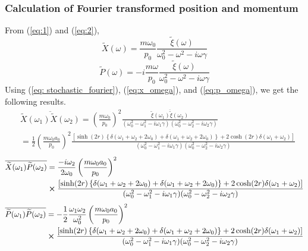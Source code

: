 \documentclass[12pt, twoside]{article}
\begin{document}
\subsubsection{Calculation of Fourier transformed position and momentum}
From (\ref{eq:1}) and (\ref{eq:2}), \begin{equation}\label{eq:x_omega}
\widetilde{X}(\omega) = \frac{m \omega_0}{p_0} \frac { \widetilde { \xi } ( \omega ) } { \omega _ { 0 } ^ { 2 } - \omega ^ { 2 } - i \omega \gamma }
\end{equation}
\begin{equation}\label{eq:p_omega}
\widetilde{P}(\omega) = -i\frac{m \omega}{p_0} \frac { \widetilde { \xi } ( \omega ) } { \omega _ { 0 } ^ { 2 } - \omega ^ { 2 } - i \omega \gamma }
\end{equation}
Using (\ref{eq: stochastic_fourier}), (\ref{eq:x_omega}), and (\ref{eq:p_omega}), we get the following results.
\begin{equation}
\begin{aligned} &\overline{\widetilde { X } ( \omega_1 )\widetilde { X } ( \omega_2 )} = \left(\frac { m \omega _ { 0 } } { p _ { 0 } }\right)^2 \frac {\overline{ \widetilde { \xi } ( \omega_1 )\widetilde { \xi } ( \omega_2 ) }} {( \omega _ { 0 } ^ { 2 } - \omega_1 ^ { 2 } - i \omega_1 \gamma)(\omega _ { 0 } ^ { 2 } - \omega_2 ^ { 2 } - i \omega_2 \gamma) }
\\ & = \frac{1}{2} \left(\frac { m \omega _ { 0 } a_0 } { p _ { 0 } }\right)^2 \frac{\left[\sinh(2r)\left\{\delta(\omega_1 + \omega_2 + 2\omega_0)+\delta(\omega_1 + \omega_2 + 2\omega_0)\right\} + 2\cosh(2r)\delta(\omega_1 + \omega_2)\right]}{( \omega _ { 0 } ^ { 2 } - \omega_1 ^ { 2 } - i \omega_1 \gamma)(\omega _ { 0 } ^ { 2 } - \omega_2 ^ { 2 } - i \omega_2 \gamma)}
\end{aligned}
\end{equation}
\begin{equation}\begin{aligned}
\overline{\widetilde { X } ( \omega_1 )\widetilde { P } ( \omega_2 )} & = \frac{-i\omega_2}{2\omega_0} \left(\frac { m \omega_0 a_0 } { p _ { 0 } }\right)^2 \\&\cross \frac{\left[\sinh(2r)\left\{\delta(\omega_1 + \omega_2 + 2\omega_0)+\delta(\omega_1 + \omega_2 + 2\omega_0)\right\} + 2\cosh(2r)\delta(\omega_1 + \omega_2)\right]}{( \omega _ { 0 } ^ { 2 } - \omega_1 ^ { 2 } - i \omega_1 \gamma)(\omega _ { 0 } ^ { 2 } - \omega_2 ^ { 2 } - i \omega_2 \gamma)} \end{aligned}
\end{equation}
\begin{equation}\begin{aligned}
\overline{\widetilde { P } ( \omega_1 )\widetilde { P } ( \omega_2 )} & = -\frac{1}{2}\frac{\omega_1 \omega_2}{\omega_{ 0 } ^2} \left(\frac { m \omega_0 a_0 } { p _ { 0 } }\right)^2 \\&\cross \frac{\left[\sinh(2r)\left\{\delta(\omega_1 + \omega_2 + 2\omega_0)+\delta(\omega_1 + \omega_2 + 2\omega_0)\right\} + 2\cosh(2r)\delta(\omega_1 + \omega_2)\right]}{( \omega _ { 0 } ^ { 2 } - \omega_1 ^ { 2 } - i \omega_1 \gamma)(\omega _ { 0 } ^ { 2 } - \omega_2 ^ { 2 } - i \omega_2 \gamma)}\end{aligned}
\end{equation}
\end{document}
